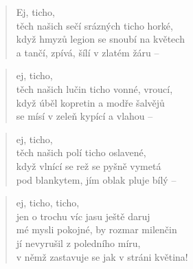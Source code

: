 \documentclass{book}
\begin{document}
\newpage
{}
\begin{verse}
Ej, ticho,\\
těch našich sečí srázných ticho horké,\\
když hmyzů legion se snoubí na květech\\
a tančí, zpívá, šílí v zlatém žáru --
\end{verse}
\begin{verse}
ej, ticho,\\
těch našich lučin ticho vonné, vroucí,\\
když úběl kopretin a modře šalvějů\\
se mísí v zeleň kypící a vlahou --
\end{verse}
\begin{verse}
ej, ticho,\\
těch našich polí ticho oslavené,\\
když vlnící se rež se pyšně vymetá\\
pod blankytem, jím oblak pluje bílý --
\end{verse}
\begin{verse}
ej, ticho, ticho,\\
jen o trochu víc jasu ještě daruj\\
mé mysli pokojné, by rozmar milenčin\\
jí nevyrušil z poledního míru,\\
v němž zastavuje se jak v stráni květina!
\end{verse}
\end{document}
